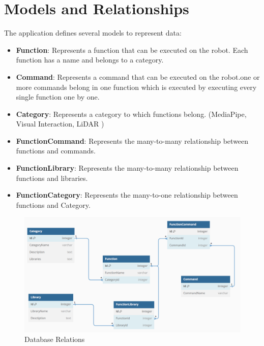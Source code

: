 \section{Models and Relationships}
The application defines several models to represent data:
\begin{itemize}
	\item \textbf{Function}: Represents a function that can be executed on the robot. Each function has a name and belongs to a category.
	\item \textbf{Command}: Represents a command that can be executed on the robot.one or more commands belong in one function which is executed by executing every single function one by one.
	\item \textbf{Category}: Represents a category to which functions belong. (MediaPipe, Visual Interaction, LiDAR )
	\item \textbf{FunctionCommand}: Represents the many-to-many relationship between functions and commands.
	\item \textbf{FunctionLibrary}: Represents the many-to-many relationship between functions and libraries.
	\item \textbf{FunctionCategory}: Represents the many-to-one relationship between functions and Category.
	
\end{itemize}

\begin{figure}[H]
	\centering
	\includegraphics[width=1\textwidth]{Images/database.png}
	\caption{Database Relations}
	\label{}
\end{figure}
